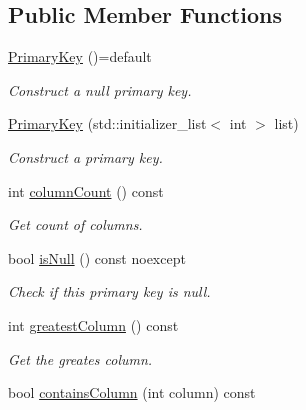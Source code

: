 \subsection*{Public Member Functions}
\begin{DoxyCompactItemize}
\item 
\hyperlink{class_mdt_1_1_item_model_1_1_primary_key_a50361c5d0ed142fbc80cf554b886a8fa}{Primary\+Key} ()=default\hypertarget{class_mdt_1_1_item_model_1_1_primary_key_a50361c5d0ed142fbc80cf554b886a8fa}{}\label{class_mdt_1_1_item_model_1_1_primary_key_a50361c5d0ed142fbc80cf554b886a8fa}

\begin{DoxyCompactList}\small\item\em Construct a null primary key. \end{DoxyCompactList}\item 
\hyperlink{class_mdt_1_1_item_model_1_1_primary_key_aa485eb3bb79f180a00fcb61fd7f0cc92}{Primary\+Key} (std\+::initializer\+\_\+list$<$ int $>$ list)
\begin{DoxyCompactList}\small\item\em Construct a primary key. \end{DoxyCompactList}\item 
int \hyperlink{class_mdt_1_1_item_model_1_1_primary_key_a2019df1e4998beca922ddc5d989728e6}{column\+Count} () const \hypertarget{class_mdt_1_1_item_model_1_1_primary_key_a2019df1e4998beca922ddc5d989728e6}{}\label{class_mdt_1_1_item_model_1_1_primary_key_a2019df1e4998beca922ddc5d989728e6}

\begin{DoxyCompactList}\small\item\em Get count of columns. \end{DoxyCompactList}\item 
bool \hyperlink{class_mdt_1_1_item_model_1_1_primary_key_af452520e425c3c8e206da55cca6dcd39}{is\+Null} () const noexcept\hypertarget{class_mdt_1_1_item_model_1_1_primary_key_af452520e425c3c8e206da55cca6dcd39}{}\label{class_mdt_1_1_item_model_1_1_primary_key_af452520e425c3c8e206da55cca6dcd39}

\begin{DoxyCompactList}\small\item\em Check if this primary key is null. \end{DoxyCompactList}\item 
int \hyperlink{class_mdt_1_1_item_model_1_1_primary_key_af8f5724d8d2fc8540ebcef0a50c38568}{greatest\+Column} () const 
\begin{DoxyCompactList}\small\item\em Get the greates column. \end{DoxyCompactList}\item 
bool \hyperlink{class_mdt_1_1_item_model_1_1_primary_key_ab02f9f7e8c3e6644b47a43b2613c397a}{contains\+Column} (int column) const \hypertarget{class_mdt_1_1_item_model_1_1_primary_key_ab02f9f7e8c3e6644b47a43b2613c397a}{}\label{class_mdt_1_1_item_model_1_1_primary_key_ab02f9f7e8c3e6644b47a43b2613c397a}


\end{DoxyCompactItemize}
